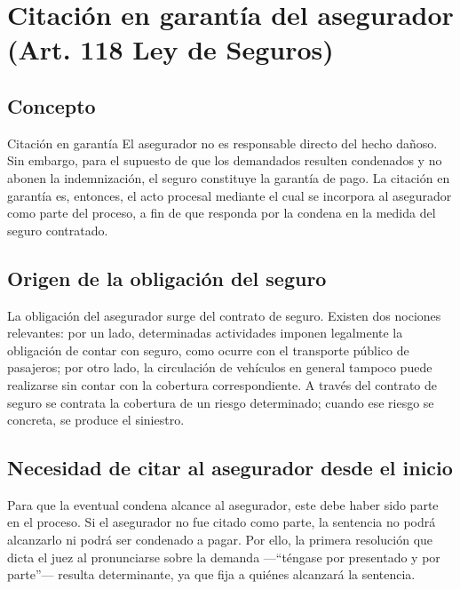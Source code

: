 \documentclass[12pt,oneside]{book}
\begin{document}
\chapter{Citación en garantía del asegurador (Art. 118 Ley de Seguros)}

\section{Concepto}

\begin{definition}{Citación en garantía}
El asegurador no es responsable directo del hecho dañoso. Sin embargo, para el supuesto de que los demandados resulten condenados y no abonen la indemnización, el seguro constituye la garantía de pago. La citación en garantía es, entonces, el acto procesal mediante el cual se incorpora al asegurador como parte del proceso, a fin de que responda por la condena en la medida del seguro contratado.
\end{definition}

\section{Origen de la obligación del seguro}

La obligación del asegurador surge del contrato de seguro. Existen dos nociones relevantes: por un lado, determinadas actividades imponen legalmente la obligación de contar con seguro, como ocurre con el transporte público de pasajeros; por otro lado, la circulación de vehículos en general tampoco puede realizarse sin contar con la cobertura correspondiente. A través del contrato de seguro se contrata la cobertura de un riesgo determinado; cuando ese riesgo se concreta, se produce el siniestro.

\section{Necesidad de citar al asegurador desde el inicio}

\begin{important}
Para que la eventual condena alcance al asegurador, este debe haber sido parte en el proceso. Si el asegurador no fue citado como parte, la sentencia no podrá alcanzarlo ni podrá ser condenado a pagar. Por ello, la primera resolución que dicta el juez al pronunciarse sobre la demanda —``téngase por presentado y por parte''— resulta determinante, ya que fija a quiénes alcanzará la sentencia.
\end{important}
\end{document}
